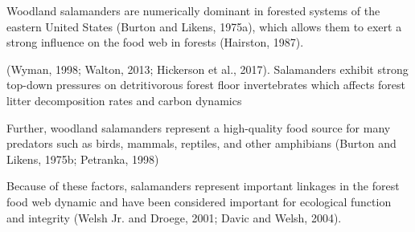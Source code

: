 Woodland salamanders are numerically dominant in forested systems of the eastern United States (Burton and Likens, 1975a), which allows them to exert a strong influence on the food web in forests (Hairston, 1987).

(Wyman, 1998; Walton, 2013; Hickerson et al., 2017). Salamanders exhibit strong top-down pressures on detritivorous forest floor invertebrates which affects forest litter decomposition rates and carbon dynamics 

Further, woodland salamanders represent a high-quality food source for many predators such as birds, mammals, reptiles, and other amphibians (Burton and Likens, 1975b; Petranka, 1998)

Because of these factors, salamanders represent important linkages in the forest food web dynamic and have been considered important for ecological function and integrity (Welsh Jr. and Droege, 2001; Davic and Welsh, 2004).

